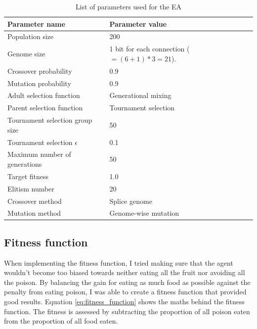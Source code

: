 \documentclass[
]{article}
\begin{document}
\begin{table}[H]
    \centering
    \begin{tabulary}{\textwidth}{|L|L|}
        \hline
        \textbf{Parameter name}         & \textbf{Parameter value} \\\hline
        Population size                 & 200 \\\hline
        Genome size                     & 1 bit for each connection ($=(6+1) * 3 = 21$). \\\hline
        Crossover probability           & 0.9 \\\hline
        Mutation probability            & 0.9 \\\hline
        Adult selection function        & Generational mixing \\\hline
        Parent selection function       & Tournament selection \\\hline
        Tournament selection group size & 50 \\\hline
        Tournament selection $\epsilon$ & 0.1 \\\hline
        Maximum number of generations   & 50 \\\hline
        Target fitness                  & 1.0 \\\hline
        Elitism number                  & 20 \\\hline
        Crossover method                & Splice genome \\\hline
        Mutation method                 & Genome-wise mutation \\\hline
    \end{tabulary}
    \caption{List of parameters used for the EA}
    \label{tab:parameters}
\end{table}

\subsection{Fitness function}
When implementing the fitness function, I tried making sure that the agent wouldn't become too biased towards neither eating all the fruit nor avoiding all the poison. By balancing the gain for eating as much food as possible against the penalty from eating poison, I was able to create a fitness function that provided good results. Equation \ref{eq:fitness_function} shows the maths behind the fitness function. The fitness is assessed by subtracting the proportion of all poison eaten from the proportion of all food eaten.
\end{document}
